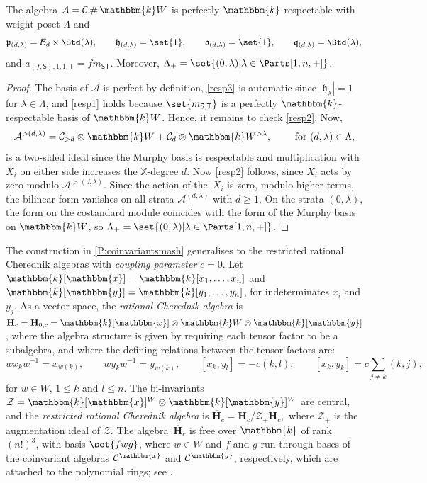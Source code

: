 \documentclass[a4paper,11pt]{amsart}
\newcommand\cB{\mathcal{B}}
\numberwithin{equation}{subsection}
\theoremstyle{definition}
\theoremstyle{theorem}
\theoremstyle{remark}
\newcommand\CA{\mathcal{A}}
\newcommand\plam[1][\lambda]{\mathfrak{p}_{#1}}
\newcommand\hlam[1][\lambda]{\mathfrak{h}_{#1}}
\newcommand\qlam[1][\lambda]{\mathfrak{q}_{#1}}
\newcommand\olam[1][\lambda]{\mathfrak{o}_{#1}}
\newcommand\Sym{W}
\newcommand\bS{{\mathsf{S}}}
\newcommand\bT{{\mathsf{T}}}
\newcommand\X{\mathbb{X}}
\newcommand\kk{\mathbbm{k}}
\DeclareMathOperator\Smash{\#}
\begin{document}
\begin{Proposition}\label{P:coinvariantsmash}
  The algebra $\CA=\mathcal{C}\Smash\kk\Sym$ is perfectly
  $\kk$-respectable with weight poset $\Lambda$ and
  \[
    \plam[(d,\lambda)]=\cB_d\times\Std(\lambda),\qquad
    \hlam[(d,\lambda)]=\set{1},\qquad
    \olam[(d,\lambda)]=\set{1},\qquad
    \qlam[(d,\lambda)]=\Std(\lambda),
  \]
  and $a_{(f,\bS),1,1,\bT}=fm_{\bS\bT}$.
  Moreover, $\Lambda_+=\set{(0,\lambda)|\lambda\in\Parts[1,n,+]}$.
  \end{Proposition}

\begin{proof}
   The basis of $\CA$ is perfect by definition, \autoref{resp3} is automatic
   since $|\hlam|=1$ for $\lambda\in\Lambda$, and \autoref{resp1} holds
   because $\set{m_{\bS,\bT}}$ is a perfectly $\kk$-respectable basis of
   $\kk\Sym$.  Hence, it remains to check \autoref{resp2}. Now,
   \[
    \CA^{>(d,\lambda)}=\mathcal{C}_{>d}\otimes\kk\Sym+\mathcal{C}_d\otimes\kk\Sym^{\vartriangleright\lambda},
    \qquad\text{ for }(d,\lambda)\in\Lambda,
   \]
   is a two-sided ideal since the Murphy basis is respectable and
   multiplication with $X_i$ on either side increases the $\X$-degree
   $d$. Now  \autoref{resp2}  follows, since $X_i$ acts by zero modulo
   $\CA^{>(d,\lambda)}$. Since the action of the~$X_i$ is zero, modulo
   higher terms, the bilinear form vanishes on all strata
   $\CA^{(d,\lambda)}$ with $d\ge1$. On the strata $(0,\lambda)$, the
   form on the costandard module coincides with the form of the Murphy
   basis on $\kk \Sym$, so
   $\Lambda_+=\set{(0,\lambda)|\lambda\in\Parts[1,n,+]}$.
\end{proof}

The construction in \autoref{P:coinvariantsmash} generalises to the
restricted rational Cherednik algebras with \emph{coupling parameter}
$c=0$. Let $\kk[\mathbbm{x}]=\kk[x_1,\dots,x_n]$ and
$\kk[\mathbbm{y}]=\kk[y_1,\dots,y_n]$, for indeterminates $x_i$ and
$y_j$. As a vector space, the \emph{rational Cherednik algebra} is
$\mathbf{H}_c=\mathbf{H}_{0,c}
   =\kk[\mathbbm{x}]\otimes\kk\Sym\otimes\kk[\mathbbm{y}]$,
where the algebra structure is given by requiring each tensor factor to
be a subalgebra, and where the defining relations between the tensor
factors are:
\begin{equation}\label{ratChrel}
  wx_kw^{-1}=x_{w(k)},\qquad  wy_kw^{-1}=y_{w(k)},\qquad   [x_k,y_l]=-c(k,l),
  \qquad [x_k,y_k]=c\sum_{j\neq k}(k,j),
\end{equation}
for $w\in\Sym$, $1\leq k$ and $l\leq n$.
The bi-invariants $\mathcal
Z=\kk[\mathbbm{x}]^{\Sym}\otimes\kk[\mathbbm{y}]^{\Sym}$ are central, and the \emph{restricted rational Cherednik algebra} is
$
  \overline{\mathbf H}_c=\mathbf H_{c}/\mathcal Z_+\mathbf H_{c},
$
where $\mathcal Z_+$ is the augmentation ideal of $\mathcal Z$. The
algebra~$\overline{\mathbf{H}}_c$ is free over $\kk$ of rank $(n!)^3$,
with basis $\set{fwg}$, where  $w\in\Sym$ and $f$ and $g$ run through
bases of the coinvariant algebras $\mathcal{C}^{\mathbbm{x}}$ and
$\mathcal{C}^{\mathbbm{y}}$, respectively, which are attached to the
polynomial rings; see \cite[Section~3.1]{BGS:Frobenius}.
\end{document}
